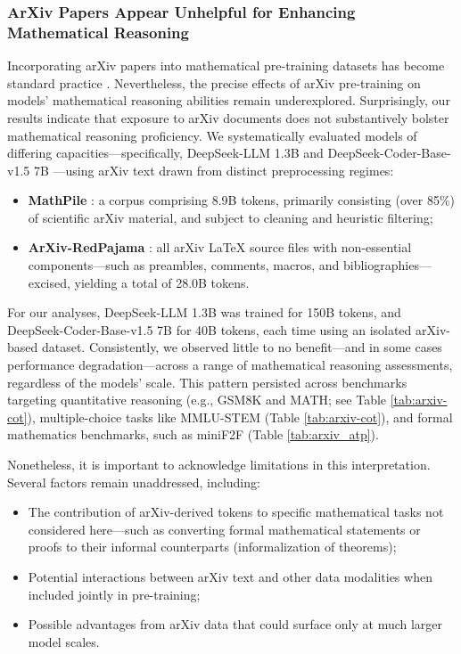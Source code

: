 {\subsubsection{ArXiv Papers Appear Unhelpful for Enhancing Mathematical Reasoning}

Incorporating arXiv papers into mathematical pre-training datasets has become standard practice \citep{minerva,gpt-f,llemma,mathpile}. Nevertheless, the precise effects of arXiv pre-training on models' mathematical reasoning abilities remain underexplored. Surprisingly, our results indicate that exposure to arXiv documents does not substantively bolster mathematical reasoning proficiency. We systematically evaluated models of differing capacities—specifically, DeepSeek-LLM 1.3B and DeepSeek-Coder-Base-v1.5 7B \citep{deepseek-coder}—using arXiv text drawn from distinct preprocessing regimes:

\begin{itemize}[topsep=0pt]
    \item \textbf{MathPile} \citep{mathpile}: a corpus comprising 8.9B tokens, primarily consisting (over 85\%) of scientific arXiv material, and subject to cleaning and heuristic filtering;
    \item \textbf{ArXiv-RedPajama} \citep{redpajama}: all arXiv LaTeX source files with non-essential components—such as preambles, comments, macros, and bibliographies—excised, yielding a total of 28.0B tokens.
\end{itemize}

For our analyses, DeepSeek-LLM 1.3B was trained for 150B tokens, and DeepSeek-Coder-Base-v1.5 7B for 40B tokens, each time using an isolated arXiv-based dataset. Consistently, we observed little to no benefit—and in some cases performance degradation—across a range of mathematical reasoning assessments, regardless of the models’ scale. This pattern persisted across benchmarks targeting quantitative reasoning (e.g., GSM8K and MATH; see Table \ref{tab:arxiv-cot}), multiple-choice tasks like MMLU-STEM (Table \ref{tab:arxiv-cot}), and formal mathematics benchmarks, such as miniF2F (Table \ref{tab:arxiv_atp}).

Nonetheless, it is important to acknowledge limitations in this interpretation. Several factors remain unaddressed, including:

\begin{itemize}[topsep=0pt]
    \item The contribution of arXiv-derived tokens to specific mathematical tasks not considered here—such as converting formal mathematical statements or proofs to their informal counterparts (informalization of theorems);
    \item Potential interactions between arXiv text and other data modalities when included jointly in pre-training;
    \item Possible advantages from arXiv data that could surface only at much larger model scales.
\end{itemize}

}
